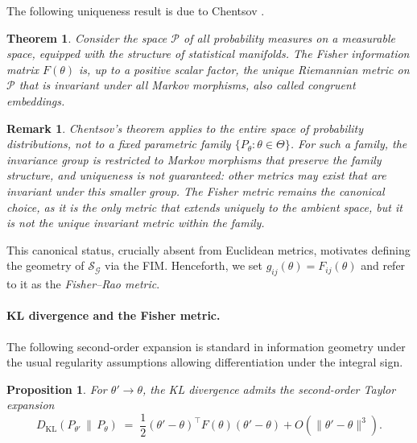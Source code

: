 \documentclass[a4paper,fleqn]{cas-dc}
\newtheorem{theorem}{Theorem}
\newtheorem{proposition}{Proposition}
\newtheorem{remark}{Remark}
\newcommand{\calP}{\mathcal{P}}
\newcommand{\calS}{\mathcal{S}}
\newcommand{\calG}{\mathcal{G}}
\newcommand{\DKL}{D_{\mathrm{KL}}}
\begin{document}
The following uniqueness result is due to Chentsov
\cite{chentsov1982statistical}.

\begin{theorem}%
  \label{thm:chentsov}
  Consider the space $\calP$ of all probability measures on a measurable
  space, equipped with the structure of statistical manifolds. The Fisher
  information matrix $F(\theta)$ is, up to a positive scalar factor, the
  \emph{unique} Riemannian metric on $\calP$ that is invariant under
  \emph{all} Markov morphisms, also called congruent embeddings.
\end{theorem}

\begin{remark}
  \label{rem:chentsov_scope}
  Chentsov's theorem applies to the \emph{entire} space of probability
  distributions, not to a fixed parametric family
  $\{P_\theta:\theta\in\Theta\}$. For such a family, the invariance
  group is restricted to Markov morphisms that preserve the family
  structure, and uniqueness is \emph{not} guaranteed: other metrics may
  exist that are invariant under this smaller group. The Fisher metric
  remains the \emph{canonical} choice, as it is the only metric that extends uniquely to the ambient space, but it is not the unique invariant metric \emph{within} the family.
\end{remark}

This canonical status, crucially absent from Euclidean metrics, motivates
defining the geometry of $\calS_{\calG}$ via the FIM.
Henceforth, we set $g_{ij}(\theta) = F_{ij}(\theta)$ and refer to it as the
\emph{Fisher--Rao metric}.

\paragraph{KL divergence and the Fisher metric.}

The following second-order expansion is standard in information geometry
under the usual regularity assumptions allowing differentiation under the
integral sign.

\begin{proposition}%
  \label{prop:kl_taylor}
  For $\theta'\to\theta$, the KL divergence admits the second-order Taylor
  expansion
  \begin{equation}
    \DKL\!\left(P_{\theta'}\,\|\,P_\theta\right)
    \;=\; \frac{1}{2}(\theta'-\theta)^\top F(\theta)(\theta'-\theta)
          + O(\|\theta'-\theta\|^3).
    \label{eq:kl_taylor}
  \end{equation}
\end{proposition}
\end{document}
